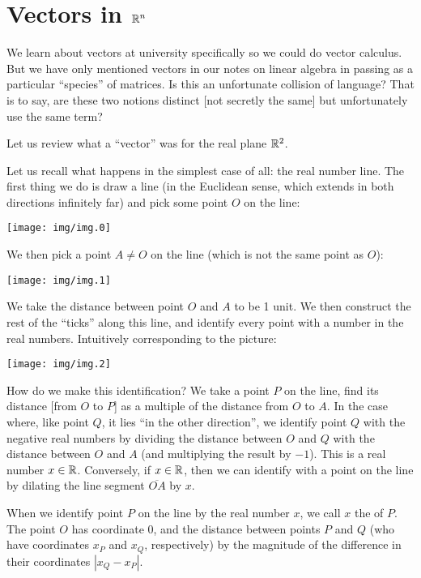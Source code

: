 \section{Vectors in \texorpdfstring{$\mathbb{R}^{n}$}{Rn}}

\M
We learn about vectors at university specifically so we could do vector
calculus. But we have only mentioned vectors in our notes on linear
algebra in passing as a particular ``species'' of matrices. Is this an
unfortunate collision of language? That is to say, are these two notions
distinct [not secretly the same] but unfortunately use the same term?

Let us review what a ``vector'' was for the real plane $\mathbb{R}^{2}$.

Let us recall what happens in the simplest case of all: the real number
line. The first thing we do is draw a line (in the Euclidean sense,
which extends in both directions infinitely far) and pick some point $O$
on the line:
\begin{center}
  \texttt{[image: img/img.0]}
\end{center}
We then pick a point $A\neq O$ on the line (which is not the same point
as $O$):
\begin{center}
  \texttt{[image: img/img.1]}
\end{center}
We take the distance between point $O$ and $A$ to be 1 unit. We then
construct the rest of the ``ticks'' along this line, and identify every
point with a number in the real numbers. Intuitively corresponding to
the picture:
\begin{center}
  \texttt{[image: img/img.2]}
\end{center}
How do we make this identification? We take a point $P$ on the line,
find its distance [from $O$ to $P$] as a multiple of the distance from
$O$ to $A$. In the case where, like point $Q$, it lies ``in the other
direction'', we identify point $Q$ with the negative real numbers by
dividing the distance between $O$ and $Q$ with the distance between $O$
and $A$ (and multiplying the result by $-1$). This is a real number
$x\in\mathbb{R}$. Conversely, if $x\in\mathbb{R}$, then we can identify with a point
on the line by dilating the line segment $\overline{OA}$ by $x$.

When we identify point $P$ on the line by the real number $x$, we call
$x$ the  of $P$. The point $O$ has coordinate $0$,
and the distance between points $P$ and $Q$ (who have coordinates
$x_{P}$ and $x_{Q}$, respectively) by the magnitude of the difference in
their coordinates $|x_{Q}-x_{P}|$.

